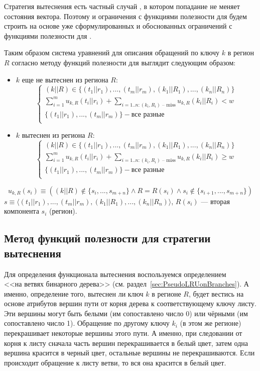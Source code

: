 Стратегия вытеснения \FIFO есть частный случай
\LRU, в котором попадание не меняет состояния вектора.
Поэтому и ограничения с функциями полезности для \FIFO будем строить
на основе уже сформулированных и обоснованных ограничений с
функциями полезности для \LRU. %

Таким образом система уравнений для описания обращений по ключу $k$ в регион $R$
согласно методу функций полезности для \FIFO выглядит следующим образом:
\begin{itemize}
\item $k$ еще не вытеснен из региона $R$:
$$
\left\{\begin{array}{l} (k||R) \in \{(t_1||r_1), ..., (t_m||r_m), (k_1||R_1),
..., (k_n||R_n)\}\\
\sum\limits_{i=1}^m u_{k,R}(t_i||r_i) + \sum\limits_{i=1..n:(k_i,R_i)\mbox{~--
miss}} u_{k,R}(k_i||R_i) < w\\
\{(t_1||r_1), ..., (t_m||r_m)\} - \mbox{все разные}\\
\end{array} \right.
$$
\item $k$ вытеснен из региона $R$:
$$
\left\{\begin{array}{l} (k||R) \in \{(t_1||r_1), ..., (t_m||r_m), (k_1||R_1),
..., (k_n||R_n)\}\\
\sum\limits_{i=1}^m u_{k,R}(t_i||r_i) + \sum\limits_{i=1..n:(k_i,R_i)\mbox{~--
miss}} u_{k,R}(k_i||R_i)
\geqslant w\\
\{(t_1||r_1), ..., (t_m||r_m)\} - \mbox{все разные}\\
\end{array} \right.
$$
\end{itemize}

$$u_{k,R}(s_i) \equiv ((k||R) \notin \{s_i, ..., s_{m+n}\} \wedge
R = R(s_i) \wedge s_i \notin\{s_{i+1},..., s_{m+n}\})$$
$s \equiv \langle (t_1||r_1), ..., (t_m||r_m), (k_1||R_1), ...,
(k_n||R_n)\rangle$, $R(s_i)$ --- вторая компонента $s_i$ (регион).


\subsection{Метод функций полезности для стратегии вытеснения \PseudoLRU}

Для определения функционала вытеснения воспользуемся определением\\\PseudoLRU <<на
ветвях бинарного дерева>> (см. раздел~\ref{sec:PseudoLRUonBranches}). А именно,
определение того, вытеснен ли ключ $k$ в регионе $R$, будет вестись на основе
атрибутов вершин пути от корня дерева к соответствующему ключу листу. Эти
вершины могут быть белыми (им сопоставлено число 0) или чёрными (им сопоставлено
число 1). Обращение по другому ключу $k_i$ (в этом же регионе) перекрашивает
некоторые вершины этого пути. А именно, при следовании от корня к листу сначала
часть вершин перекрашивается в белый цвет, затем одна вершина красится в черный
цвет, остальные вершины не перекрашиваются. Если происходит обращение к листу ветви,
то вся она красится в белый цвет.

